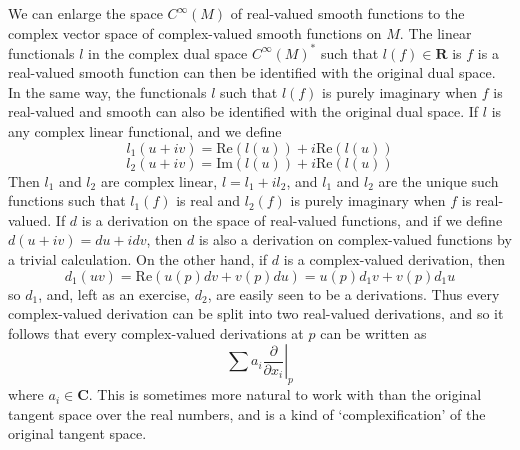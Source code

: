 \begin{remark}
    We can enlarge the space $C^\infty(M)$ of real-valued smooth functions to the complex vector space of complex-valued smooth functions on $M$. The linear functionals $l$ in the complex dual space $C^\infty(M)^*$ such that $l(f) \in \mathbf{R}$ is $f$ is a real-valued smooth function can then be identified with the original dual space. In the same way, the functionals $l$ such that $l(f)$ is purely imaginary when $f$ is real-valued and smooth can also be identified with the original dual space. If $l$ is any complex linear functional, and we define
    \[ l_1(u + iv) = \text{Re}(l(u)) + i\text{Re}(l(u)) \]
    \[ l_2(u + iv) = \text{Im}(l(u)) + i\text{Re}(l(u)) \]
    Then $l_1$ and $l_2$ are complex linear, $l = l_1 + il_2$, and $l_1$ and $l_2$ are the unique such functions such that $l_1(f)$ is real and $l_2(f)$ is purely imaginary when $f$ is real-valued. If $d$ is a derivation on the space of real-valued functions, and if we define $d(u + iv) = du + idv$, then $d$ is also a derivation on complex-valued functions by a trivial calculation. On the other hand, if $d$ is a complex-valued derivation, then
    \[ d_1(uv) = \text{Re}(u(p) dv + v(p) du) = u(p) d_1v + v(p) d_1u \]
    so $d_1$, and, left as an exercise, $d_2$, are easily seen to be a derivations. Thus every complex-valued derivation can be split into two real-valued derivations, and so it follows that every complex-valued derivations at $p$ can be written as
    \[ \sum a_i \left. \frac{\partial}{\partial x_i} \right|_p \]
    where $a_i \in \mathbf{C}$. This is sometimes more natural to work with than the original tangent space over the real numbers, and is a kind of `complexification' of the original tangent space.
\end{remark}

